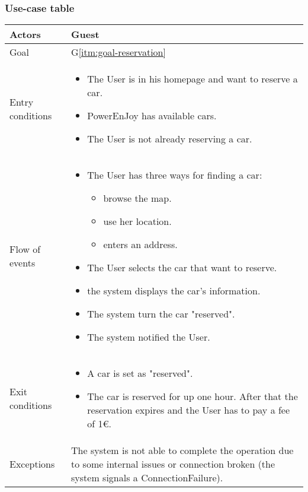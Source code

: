 \subsubsection{Use-case table}
\begin{center}
  \begin{tabular}{ l | p{10cm} }
    \hline
    Actors & Guest\\ \hline
    Goal & G\ref{itm:goal-reservation}\\ \hline
    Entry conditions & \begin{itemize}
			\item The User is in his homepage and want to reserve a car.
			\item PowerEnJoy has available cars.
			\item The User is not already reserving a car.
\end{itemize}  \\ \hline
    Flow of events &
\begin{itemize}
\item The User has three ways for finding a car:
\begin{itemize}
			\item browse the map.
			\item use her location.
			\item enters an address.
\end{itemize}
\item The User selects the car that want to reserve.
\item the system displays the car's information.%
\item The system turn the car "reserved".%
\item The system notified the User.
\end{itemize} \\ \hline
    Exit conditions &
\begin{itemize}
	\item A car is set as "reserved".
	\item The car is reserved for up one hour. After that the reservation expires and the User has to pay a fee of 1€.
\end{itemize}  \\ \hline
  Exceptions & 

The system is not able to complete the operation due to some internal issues or connection broken (the system signals a ConnectionFailure).%
\\ \hline
  \end{tabular}
\end{center}



